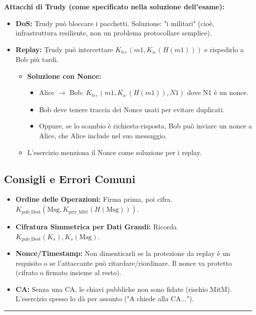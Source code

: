 \textbf{Attacchi di Trudy (come specificato nella soluzione dell'esame):}
\begin{itemize}
    \item \textbf{DoS:} Trudy può bloccare i pacchetti. Soluzione: "i militari" (cioè, infrastruttura resiliente, non un problema protocollare semplice).
    \item \textbf{Replay:} Trudy può intercettare $K_{\text{b+}}(m1, K_{\text{a-}}(H(m1)))$ e rispedirlo a Bob più tardi.
    \begin{itemize}
        \item \textbf{Soluzione con Nonce:}
            \begin{itemize}
                \item Alice $\to$ Bob: $K_{\text{b+}}(m1, K_{\text{a-}}(H(m1)), N1)$ dove N1 è un nonce.
                \item Bob deve tenere traccia dei Nonce usati per evitare duplicati.
                \item Oppure, se lo scambio è richiesta-risposta, Bob può inviare un nonce a Alice, che Alice include nel suo messaggio.
            \end{itemize}
        \item L'esercizio menziona il Nonce come soluzione per i replay.
    \end{itemize}
\end{itemize}

\subsection{Consigli e Errori Comuni}
\begin{itemize}
    \item \textbf{Ordine delle Operazioni:} Firma prima, poi cifra. $K_{\text{pub\_Dest}}(\text{Msg}, K_{\text{priv\_Mitt}}(H(\text{Msg})))$.
    \item \textbf{Cifratura Simmetrica per Dati Grandi:} Ricorda $K_{\text{pub\_Dest}}(K_s), K_s(\text{Msg})$.
    \item \textbf{Nonce/Timestamp:} Non dimenticarli se la protezione da replay è un requisito o se l'attaccante può ritardare/riordinare. Il nonce va protetto (cifrato o firmato insieme al resto).
    \item \textbf{CA:} Senza una CA, le chiavi pubbliche non sono fidate (rischio MitM). L'esercizio spesso lo dà per assunto ("A chiede alla CA...").
\end{itemize}

\hrule %

